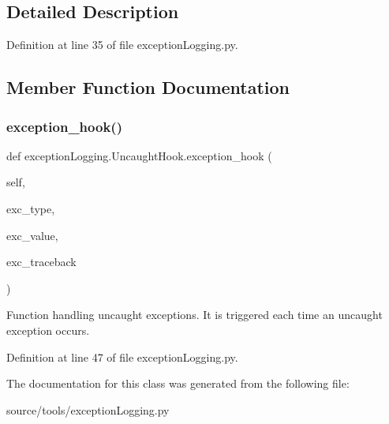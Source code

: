 \subsection{Detailed Description}


Definition at line 35 of file exception\+Logging.\+py.



\subsection{Member Function Documentation}
\mbox{\label{classexception_logging_1_1_uncaught_hook_a33bf5181b6444bdcf7946dd96dc1d773}} 
\subsubsection{\texorpdfstring{exception\_hook()}{exception\_hook()}}
{\footnotesize\ttfamily def exception\+Logging.\+Uncaught\+Hook.\+exception\+\_\+hook (\begin{DoxyParamCaption}\item[{}]{self,  }\item[{}]{exc\+\_\+type,  }\item[{}]{exc\+\_\+value,  }\item[{}]{exc\+\_\+traceback }\end{DoxyParamCaption})}

\begin{DoxyVerb}Function handling uncaught exceptions.
It is triggered each time an uncaught exception occurs. 
\end{DoxyVerb}
 

Definition at line 47 of file exception\+Logging.\+py.



The documentation for this class was generated from the following file\+:\begin{DoxyCompactItemize}
\item 
source/tools/exception\+Logging.\+py\end{DoxyCompactItemize}
